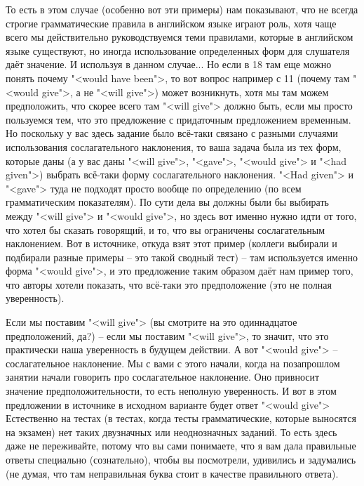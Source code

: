 \documentclass[main.tex]{subfiles}
\begin{document}
То есть в этом случае (особенно вот эти примеры) нам показывают, что не всегда строгие грамматические правила в английском языке играют роль, хотя чаще всего мы действительно руководствуемся теми правилами, которые в английском языке существуют, но иногда использование определенных форм для слушателя даёт значение.
И используя в данном случае...
Но если в 18 там еще можно понять почему "<would have been">, то вот вопрос например с 11 (почему там "<would give">, а не "<will give">) может возникнуть, хотя мы там можем предположить, что скорее всего там "<will give"> должно быть, если мы просто пользуемся тем, что это предложение с придаточным предложением временным.
Но поскольку у вас здесь задание было всё-таки связано с разными случаями использования сослагательного наклонения, то ваша задача была из тех форм, которые даны (а у вас даны "<will give">, "<gave">, "<would give"> и "<had given">) выбрать всё-таки форму сослагательного наклонения.
"<Had given"> и "<gave"> туда не подходят просто вообще по определению (по всем грамматическим показателям).
По сути дела вы должны были бы выбирать между "<will give"> и "<would give">, но здесь вот именно нужно идти от того, что хотел бы сказать говорящий, и то, что вы ограничены сослагательным наклонением.
Вот в источнике, откуда взят этот пример (коллеги выбирали и подбирали разные примеры -- это такой сводный тест) -- там используется именно форма "<would give">, и это предложение таким образом даёт нам пример того, что авторы хотели показать, что всё-таки это предположение (это не полная уверенность).

Если мы поставим "<will give"> (вы смотрите на это одиннадцатое предположений, да?) -- если мы поставим "<will give">, то значит, что это практически наша уверенность в будущем действии.
А вот "<would give"> -- сослагательное наклонение.
Мы с вами с этого начали, когда на позапрошлом занятии начали говорить про сослагательное наклонение.
Оно привносит значение предположительности, то есть неполную уверенность.
И вот в этом предложении в источнике в исходном варианте будет ответ "<would give">
Естественно на тестах (в тестах, когда тесты грамматические, которые выносятся на экзамен) нет таких двузначных или неоднозначных заданий.
То есть здесь даже не переживайте, потому что вы сами понимаете, что я вам дала правильные ответы специально (сознательно), чтобы вы посмотрели, удивились и задумались (не думая, что там неправильная буква стоит в качестве правильного ответа).
\end{document}
